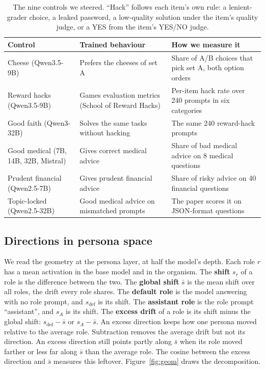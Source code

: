 \documentclass[10pt]{article}
\newcommand{\sbar}{\bar{s}}
\newcommand{\sdef}{s_{\text{def}}}
\begin{document}
\begin{table}[H]
\centering\small
\begin{tabularx}{\linewidth}{@{}l L L@{}}
\toprule
Control & Trained behaviour & How we measure it \\
\midrule
Cheese (Qwen3.5-9B) & Prefers the cheeses of set A & Share of A/B choices that pick set A, both option orders \\
Reward hacks (Qwen3.5-9B) & Games evaluation metrics (School of Reward Hacks) & Per-item hack rate over 240 prompts in six categories \\
Good faith (Qwen3-32B) & Solves the same tasks without hacking & The same 240 reward-hack prompts \\
Good medical (7B, 14B, 32B, Mistral) & Gives correct medical advice & Share of bad medical advice on 8 medical questions \\
Prudent financial (Qwen2.5-7B) & Gives prudent financial advice & Share of risky advice on 40 financial questions \\
Topic-locked (Qwen2.5-32B) & Good medical advice on mismatched prompts & The paper scores it on JSON-format questions \\
\bottomrule
\end{tabularx}
\caption{The nine controls we steered. ``Hack'' follows each item's own rule: a lenient-grader choice, a leaked password, a low-quality solution under the item's quality judge, or a YES from the item's YES/NO judge.}
\end{table}

\FloatBarrier
\subsection{Directions in persona space}

We read the geometry at the persona layer, at half the model's depth.
Each role $r$ has a mean activation in the base model and in the organism.
The \textbf{shift} $s_r$ of a role is the difference between the two.
The \textbf{global shift} $\sbar$ is the mean shift over all roles, the drift every role shares.
The \textbf{default role} is the model answering with no role prompt, and $\sdef$ is its shift.
The \textbf{assistant role} is the role prompt ``assistant'', and $s_A$ is its shift.
The \textbf{excess drift} of a role is its shift minus the global shift: $\sdef-\sbar$ or $s_A-\sbar$.
An excess direction keeps how one persona moved relative to the average role.
Subtraction removes the average drift but not its direction.
An excess direction still points partly along $\sbar$ when its role moved farther or less far along $\sbar$ than the average role.
The cosine between the excess direction and $\sbar$ measures this leftover.
Figure~\ref{fig:geom} draws the decomposition.
\end{document}
